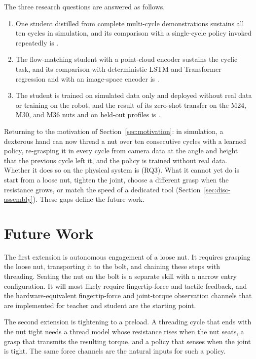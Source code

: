 The three research questions are answered as follows.
\begin{enumerate}
  \item[RQ1] One student distilled from complete multi-cycle demonstrations sustains all ten cycles in simulation, and its comparison with a single-cycle policy invoked repeatedly is \tbd.
  \item[RQ2] The flow-matching student with a point-cloud encoder sustains the cyclic task, and its comparison with deterministic \ac{LSTM} and Transformer regression and with an image-space encoder is \tbd.
  \item[RQ3] The student is trained on simulated data only and deployed without real data or training on the robot, and the result of its zero-shot transfer on the M24, M30, and M36 nuts and on held-out profiles is \tbd.
\end{enumerate}

Returning to the motivation of Section~\ref{sec:motivation}: in simulation, a dexterous hand can now thread a nut over ten consecutive cycles with a learned policy, re-grasping it in every cycle from camera data at the angle and height that the previous cycle left it, and the policy is trained without real data. Whether it does so on the physical system is \tbd{} (RQ3). What it cannot yet do is start from a loose nut, tighten the joint, choose a different grasp when the resistance grows, or match the speed of a dedicated tool (Section~\ref{sec:disc-assembly}). These gaps define the future work.

\section{Future Work}\label{sec:future-work}

The first extension is autonomous engagement of a loose nut. It requires grasping the loose nut, transporting it to the bolt, and chaining these steps with threading. Seating the nut on the bolt is a separate skill with a narrow entry configuration. It will most likely require fingertip-force and tactile feedback, and the hardware-equivalent fingertip-force and joint-torque observation channels that are implemented for teacher and student are the starting point.

The second extension is tightening to a preload. A threading cycle that ends with the nut tight needs a thread model whose resistance rises when the nut seats, a grasp that transmits the resulting torque, and a policy that senses when the joint is tight. The same force channels are the natural inputs for such a policy.

